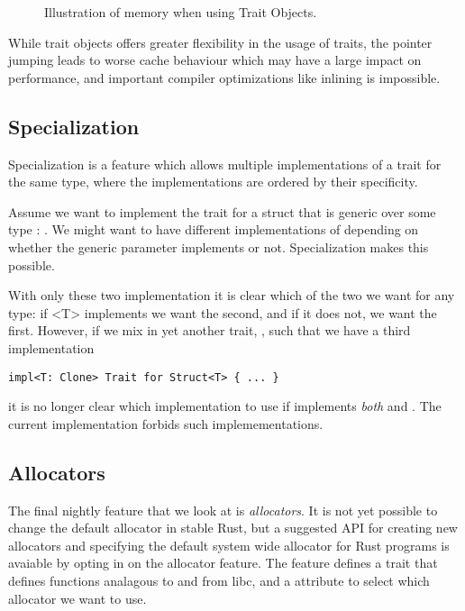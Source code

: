 \begin{figure}[ht]
  \centering
  
  \caption{Illustration of memory when using Trait Objects.\label{fig:trait-objects}}
\end{figure}

While trait objects offers greater flexibility in the usage of traits, the pointer jumping leads to
worse cache behaviour which may have a large impact on performance, and important compiler
optimizations like inlining is impossible.



\subsection{Specialization\label{sec:specialization}}

Specialization is a feature which allows multiple implementations of a trait for the same type,
where the implementations are ordered by their specificity.

Assume we want to implement the trait  for a struct that is generic over some type
: . We might want to have different implementations of 
depending on whether the generic parameter  implements  or not.
Specialization makes this possible.


With only these two implementation it is clear which of the two we want for any type: if \code<T>
implements  we want the second, and if it does not, we want the first. However, if we
mix in yet another trait, , such that we have a third implementation
\begin{lstlisting}[style=Rust]
impl<T: Clone> Trait for Struct<T> { ... }
\end{lstlisting}
it is no longer clear which implementation to use if  implements \emph{both} 
and . The current implementation forbids such implemementations.


\subsection{Allocators\label{sec:allocators}}

The final nightly feature that we look at is \emph{allocators}. It is not yet possible to change
the default allocator in stable Rust, but a suggested API for creating new allocators and
specifying the default system wide allocator for Rust programs is avaiable by opting in on the
allocator feature. The feature defines a trait  that defines functions analagous
to  and  from libc, and a attribute  to select
which allocator we want to use.

